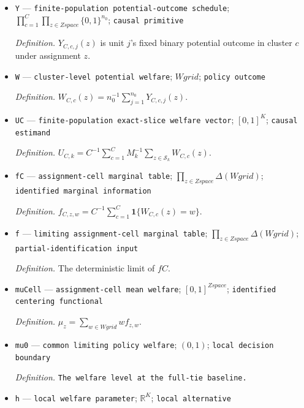 \documentclass{article}
\begin{document}
\begin{itemize}
  \par\smallskip\noindent\emph{Definition.} \texttt{The finite-\allowbreak{}population size in the triangular sequence.}
  \item \texttt{Y} --- \texttt{finite-\allowbreak{}population potential-\allowbreak{}outcome schedule}; \(\prod_{c=1}^{C}\prod_{z\in Zspace}\{0,1\}^{n_0}\); \texttt{causal primitive}
  \par\smallskip\noindent\emph{Definition.} \(Y_{C,c,j}(z)\) is unit \(j\)'s fixed binary potential outcome in cluster \(c\) under assignment \(z\).
  \item \texttt{W} --- \texttt{cluster-\allowbreak{}level potential welfare}; \(Wgrid\); \texttt{policy outcome}
  \par\smallskip\noindent\emph{Definition.} \(W_{C,c}(z)=n_0^{-1}\sum_{j=1}^{n_0}Y_{C,c,j}(z)\).
  \item \texttt{UC} --- \texttt{finite-\allowbreak{}population exact-\allowbreak{}slice welfare vector}; \([0,1]^K\); \texttt{causal estimand}
  \par\smallskip\noindent\emph{Definition.} \(U_{C,k}=C^{-1}\sum_{c=1}^{C}M_k^{-1}\sum_{z\in\mathcal S_k}W_{C,c}(z)\).
  \item \texttt{fC} --- \texttt{assignment-\allowbreak{}cell marginal table}; \(\prod_{z\in Zspace}\Delta(Wgrid)\); \texttt{identified marginal information}
  \par\smallskip\noindent\emph{Definition.} \(f_{C,z,w}=C^{-1}\sum_{c=1}^{C}\mathbf 1\{W_{C,c}(z)=w\}\).
  \item \texttt{f} --- \texttt{limiting assignment-\allowbreak{}cell marginal table}; \(\prod_{z\in Zspace}\Delta(Wgrid)\); \texttt{partial-\allowbreak{}identification input}
  \par\smallskip\noindent\emph{Definition.} The deterministic limit of \(fC\).
  \item \texttt{muCell} --- \texttt{assignment-\allowbreak{}cell mean welfare}; \([0,1]^{Zspace}\); \texttt{identified centering functional}
  \par\smallskip\noindent\emph{Definition.} \(\mu_z=\sum_{w\in Wgrid}w f_{z,w}\).
  \item \texttt{mu0} --- \texttt{common limiting policy welfare}; \((0,1)\); \texttt{local decision boundary}
  \par\smallskip\noindent\emph{Definition.} \texttt{The welfare level at the full-\allowbreak{}tie baseline.}
  \item \texttt{h} --- \texttt{local welfare parameter}; \(\mathbb R^K\); \texttt{local alternative}

\end{itemize}
\end{document}
